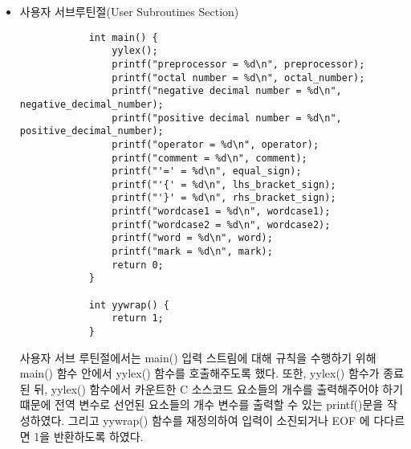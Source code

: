 \documentclass{article}
\begin{document}
\begin{itemize}
\begin{itemize}
			e 로 시작하고, m 으로 끝나는 단어의 규칙이다. 가운데에 있는 WORD 변수는
			숫자 또는 영어 대소문자 또는 언더 바 문자를 의미한다.
			\item {\bf word 정규표현식 및 규칙}
			\begin{lstlisting}
			{WORD_START}{WORD}*	{word++;}
			\end{lstlisting}
			word 는 C 언어의 변수 명명 규칙과 동일하다. 맨 처음 글자는 숫자가 아닌 영어 대소문자
			또는 언더 바로 이루어져 있으며, 그 다음으로 숫자 또는 영어 대소문자 또는 언더 바 문자가
			0 번이상 반복하여 이루어진 문자열 패텬을 의미한다.
			\item {\bf mark 정규표현식 및 규칙}
			\begin{lstlisting}
			\n|.	{mark++;}
			\end{lstlisting}
			위의 정규표현식과 매칭되지 않은 나머지 문자들을 세어주는 규칙이다.
			$\backslash n$ 는 개행문자를 의미하고, .은 개행문자를 제외한 모든 문자를 의미한다.
			즉 위의 정규표현식과 매칭되지 않았으면 모두 이 규칙에 해당하게 된다.
		\end{itemize}

		\newpage
	\item 사용자 서브루틴절(User Subroutines Section)	
		\begin{lstlisting}
			int main() {
				yylex();
				printf("preprocessor = %d\n", preprocessor);
				printf("octal number = %d\n", octal_number);
				printf("negative decimal number = %d\n", negative_decimal_number);
				printf("positive decimal number = %d\n", positive_decimal_number);
				printf("operator = %d\n", operator);
				printf("comment = %d\n", comment);
				printf("'=' = %d\n", equal_sign);
				printf("'{' = %d\n", lhs_bracket_sign);
				printf("'}' = %d\n", rhs_bracket_sign);
				printf("wordcase1 = %d\n", wordcase1);
				printf("wordcase2 = %d\n", wordcase2);
				printf("word = %d\n", word);
				printf("mark = %d\n", mark);
				return 0;
			}
			
			int yywrap() {
				return 1;
			}
		\end{lstlisting}
		사용자 서브 루틴절에서는 main() 입력 스트림에 대해 규칙을 수행하기 위해 
		main() 함수 안에서 yylex() 함수를 호출해주도록 했다. 또한, yylex()
		함수가 종료된 뒤, yylex() 함수에서 카운트한 C 소스코드 요소들의 개수를
		출력해주어야 하기 떄문에 전역 변수로 선언된 요소들의 개수 변수를 출력할 수
		있는 printf()문을 작성하였다. 그리고 yywrap() 함수를 재정의하여 입력이
		소진되거나 EOF 에 다다르면 1을 반환하도록 하였다.
\end{itemize}
\end{document}
